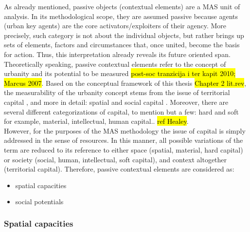 \documentclass[11pt]{report}
\begin{document}
As already mentioned, passive objects (contextual elements) are a MAS unit of analysis.
In its methodological scope, they are assumed passive because agents (urban key agents) are the core activators/exploiters of their agency.
More precisely, such category is not about the individual objects, but rather brings up sets of elements, factors and circumstances that, once united, become the basis for action. Thus, this interpretation already reveals its future oriented span. 
\\
Theoretically speaking, passive contextual elements refer to the concept of urbanity and its potential to be measured \hl{post-soc tranzicija i ter kapit 2010; Marcus 2007}. Based on the conceptual framework of this thesis \hl{Chapter 2 lit.rev}, the measurability of the urbanity concept stems from the issue of territorial capital \cite{Camagni and Capello 2012}, and more in detail: spatial \cite{Marcus 2007} and social capital \cite{Golubovic 2007}. Moreover, there are several different categorizations of capital, to mention but a few: hard and soft for example, material, intellectual, human capital.. \hl{ref Healey}.
\\
However, for the purposes of the MAS methodology the issue of capital is simply addressed in the sense of resources.
In this manner, all possible variations of the term are reduced to its reference to either space (spatial, material, hard capital) or society (social, human, intellectual, soft capital), and context altogether (territorial capital).
Therefore, passive contextual elements are considered as:
\begin{itemize}
\item spatial capacities
\item social potentials
\end{itemize}

\subsubsection{Spatial capacities}
\end{document}
